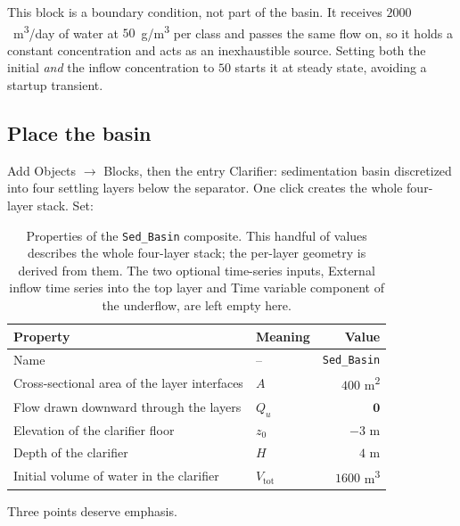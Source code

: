 \documentclass[11pt,a4paper]{article}
\newcommand{\code}[1]{\texttt{\small #1}}
\newcommand{\menu}[1]{\textsf{#1}}
\begin{document}
This block is a boundary condition, not part of the basin. It receives
$2000$~m\textsuperscript{3}/day of water at $50$~g/m\textsuperscript{3} per
class and passes the same flow on, so it holds a constant concentration and acts
as an inexhaustible source. Setting both the initial \emph{and} the inflow
concentration to $50$ starts it at steady state, avoiding a startup transient.

\subsection{Place the basin}

\menu{Add Objects $\rightarrow$ Blocks}, then the entry
\menu{Clarifier: sedimentation basin discretized into four settling layers}
below the separator. One click creates the whole four-layer stack. Set:

\begin{table}[htbp]
\centering
\caption{Properties of the \code{Sed\_Basin} composite. This handful of values
describes the whole four-layer stack; the per-layer geometry is derived from
them. The two optional time-series inputs, \menu{External inflow time series
into the top layer} and \menu{Time variable component of the underflow}, are
left empty here.}
\label{tab:basin}
\begin{tabular}{llr}
\toprule
Property & Meaning & Value \\
\midrule
\menu{Name} & -- & \code{Sed\_Basin} \\
\menu{Cross-sectional area of the layer interfaces} & $A$ & $400$ m\textsuperscript{2} \\
\menu{Flow drawn downward through the layers}       & $Q_u$ & $\mathbf{0}$ \\
\menu{Elevation of the clarifier floor}             & $z_0$ & $-3$ m \\
\menu{Depth of the clarifier}                       & $H$ & $4$ m \\
\menu{Initial volume of water in the clarifier}     & $V_\mathrm{tot}$ & $1600$ m\textsuperscript{3} \\
\bottomrule
\end{tabular}
\end{table}

Three points deserve emphasis.
\end{document}
